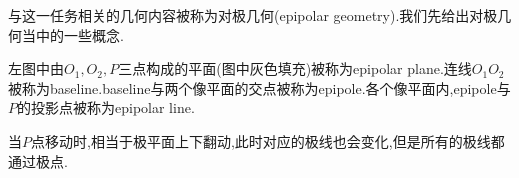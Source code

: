 \begin{figure}[htbp]
	\centering
\end{figure}

与这一任务相关的几何内容被称为对极几何(epipolar geometry).我们先给出对极几何当中的一些概念.

左图中由$O_1, O_2, P$三点构成的平面(图中灰色填充)被称为epipolar plane.连线$O_1O_2$被称为baseline.baseline与两个像平面的交点被称为epipole.各个像平面内,epipole与$P$的投影点被称为epipolar line.

当$P$点移动时,相当于极平面上下翻动,此时对应的极线也会变化,但是所有的极线都通过极点.

